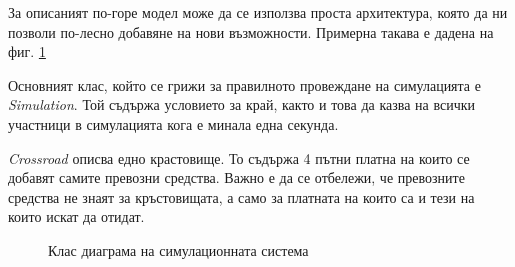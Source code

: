 		За описаният по-горе модел може да се използва проста архитектура, 
		която да ни позволи по-лесно добавяне на нови възможности. Примерна
		такава е дадена на фиг. \ref{figure:simulation-class-diagram}
		
		Основният клас, който се грижи за правилното провеждане на симулацията е \emph{Simulation}.
		Той съдържа условието за край, както и това да казва на всички участници в симулацията кога е
		минала една секунда.
		
		\emph{Crossroad} описва едно крастовище. То съдържа 4 пътни платна на които се добавят самите
		превозни средства. Важно е да се отбележи, че превозните средства не знаят за кръстовищата, а
		само за платната на които са и тези на които искат да отидат.									
	
		\begin{figure}
			\caption{Клас диаграма на симулационната система}
			\label{figure:simulation-class-diagram}
				\begin{center}
				\end{center}
		\end{figure}
		
